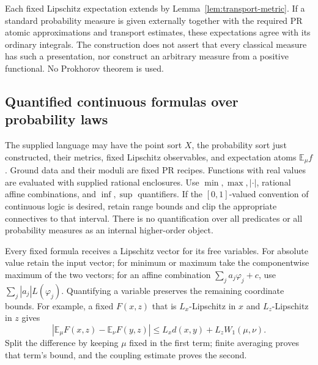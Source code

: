 Each fixed Lipschitz expectation extends by
Lemma~\ref{lem:transport-metric}.  If a standard probability measure is
given externally together with the required PR atomic approximations and
transport estimates, these expectations agree with its ordinary
integrals.  The construction does not assert that every classical measure
has such a presentation, nor construct an arbitrary measure from a
positive functional.  No Prokhorov theorem is used.

\subsection{Quantified continuous formulas over probability laws}

The supplied language may have the point sort \(X\), the probability
sort just constructed, their metrics, fixed Lipschitz observables, and
expectation atoms \(\mathbb E_\mu f\).  Ground data and their moduli
are fixed PR recipes.  Functions with real values are evaluated with
supplied rational enclosures.  Use \(\min,\max,|\cdot|\), rational
affine combinations, and \(\inf,\sup\) quantifiers.  If the
\([0,1]\)-valued convention of continuous logic is desired, retain
range bounds and clip the appropriate connectives to that interval.
There is no quantification over all predicates or all probability measures
as an internal higher-order object.

Every fixed formula receives a Lipschitz vector for its free variables.
For absolute value retain the input vector; for minimum or maximum take
the componentwise maximum of the two vectors; for an affine combination
\(\sum_j a_j\varphi_j+c\), use
\(\sum_j|a_j|L(\varphi_j)\).  Quantifying a variable preserves the
remaining coordinate bounds.  For example, a fixed \(F(x,z)\) that is
\(L_x\)-Lipschitz in \(x\) and \(L_z\)-Lipschitz in \(z\) gives
\[
 |\mathbb E_\mu F(x,z)-\mathbb E_\nu F(y,z)|
 \leq L_xd(x,y)+L_zW_1(\mu,\nu).
\]
Split the difference by keeping \(\mu\) fixed in the first term;
finite averaging proves that term's bound, and the coupling estimate
proves the second.

